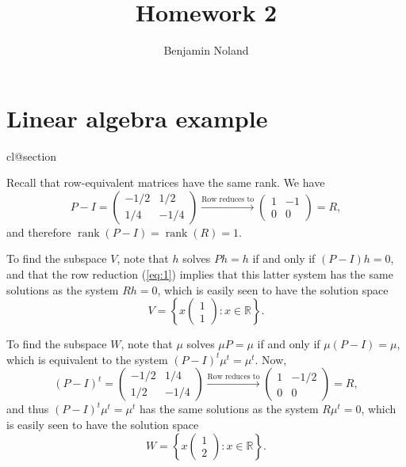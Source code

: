 \documentclass[12pt]{article}
\title{Homework 2}
\author{Benjamin Noland}
\date{}
\makeatletter
\def\nullstepcounter#1{%
	\begingroup
		\let\@elt\@stpelt
		\csname cl@#1\endcsname
	\endgroup}
\DeclareMathOperator{\rank}{rank}
\makeatother
\begin{document}
\maketitle

\section*{Linear algebra example}
\nullstepcounter{section}

Recall that row-equivalent matrices have the same rank. We have
\begin{equation} \label{eq:1}
P - I = \begin{pmatrix}
-1/2 & 1/2 \\
1/4 & -1/4
\end{pmatrix}
\xrightarrow{\text{Row reduces to}}
\begin{pmatrix}
1 & -1 \\
0 & 0
\end{pmatrix}
= R,
\end{equation}
and therefore $\rank(P-I) = \rank(R) = 1$.

To find the subspace $V$, note that $h$ solves $Ph = h$ if and only if $(P - I)h = 0$, and that the row reduction (\ref{eq:1}) implies that this latter system has the same solutions as the system $Rh = 0$, which is easily seen to have the solution space
\begin{equation*}
V = \left\{x
\begin{pmatrix}
1 \\
1
\end{pmatrix}
: x \in \mathbb{R} \right\}.
\end{equation*}

To find the subspace $W$, note that $\mu$ solves $\mu P = \mu$ if and only if $\mu (P - I) = \mu$, which is equivalent to the system $(P - I)^t\mu^t = \mu^t$. Now,
\begin{equation*}
(P - I)^t = \begin{pmatrix}
-1/2 & 1/4 \\
1/2 & -1/4
\end{pmatrix}
\xrightarrow{\text{Row reduces to}}
\begin{pmatrix}
1 & -1/2 \\
0 & 0
\end{pmatrix}
= R,
\end{equation*}
and thus $(P - I)^t\mu^t = \mu^t$ has the same solutions as the system $R\mu^t = 0$, which is easily seen to have the solution space
\begin{equation*}
W = \left\{x
\begin{pmatrix}
1 \\
2
\end{pmatrix}
: x \in \mathbb{R} \right\}.
\end{equation*}
\end{document}
